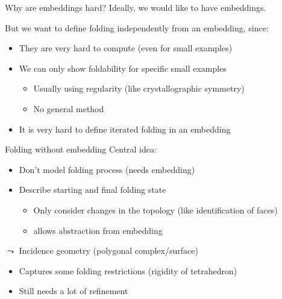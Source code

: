 \begin{frame}{Why are embeddings hard?}
    \pause
    Ideally, we would like to have embeddings.
    
    \pause
    But we want to define folding independently from an embedding, since:

    \begin{itemize}
        \pause
        \item They are very hard to compute (even for small examples)
        \pause
        \item We can only show foldability for specific small examples
            \begin{itemize}
                \pause
                \item Usually using regularity (like crystallographic symmetry)
                \pause
                \item No general method
            \end{itemize}
        \pause
        \item It is very hard to define iterated folding in an embedding
    \end{itemize}

    \pause
    \begin{center}
    \end{center}

\end{frame}


\begin{frame}{Folding without embedding}
    \pause
    Central idea:
    \begin{itemize}
        \pause
        \item Don't model folding process (needs embedding)
        \pause
        \item Describe starting and final folding state
            \begin{itemize}
                \pause
                \item Only consider changes in the topology
                    \pause (like identification of faces)
                \pause
                \item allows abstraction from embedding
            \end{itemize}
    \end{itemize}


    \pause
    $\leadsto$ Incidence geometry (polygonal complex/surface)

    \begin{itemize}
        \pause
        \item Captures some folding restrictions \pause (rigidity of tetrahedron)
        \pause
        \item Still needs a lot of refinement
    \end{itemize}
\end{frame}


